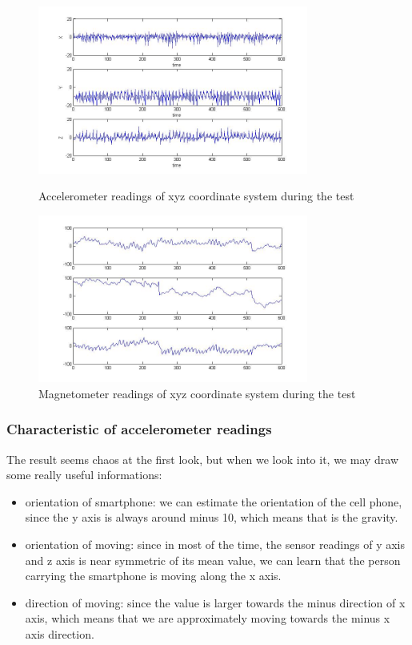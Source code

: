 \documentclass[journal]{IEEEtran}
\begin{document}
\begin{figure}
	\centering
	\includegraphics[width=3.5in]{figures/AccTest}
	\caption{Accelerometer readings of xyz coordinate system during the test}
	\includegraphics[width=3.5in]{figures/MagTest}
	\caption{Magnetometer readings of xyz coordinate system during the test}
\end{figure}

\subsubsection{Characteristic of accelerometer readings} 
The result seems chaos at the first look, but when we look into it, we may draw some really useful informations:

\begin{itemize}
	\item orientation of smartphone: 
		we can estimate the orientation of the cell phone, since the y axis is always around minus 10, which means that is the gravity.
	\item orientation of moving: 
		since in most of the time, the sensor readings of y axis and z axis is near symmetric of its mean value, we can learn that the person carrying the smartphone is moving along the x axis.
	\item direction of moving: 
		since the value is larger towards the minus direction of x axis, which means that we are approximately moving towards the minus x axis direction.
\end{itemize}
\end{document}
